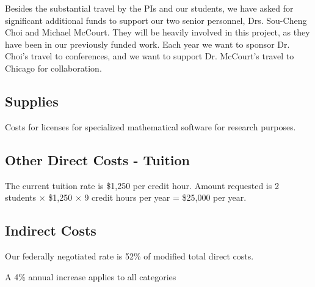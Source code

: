 \documentclass[11pt]{NSFamsart}
\begin{document}
Besides the substantial travel by the PIs and our students, we have asked for significant additional funds to support our two senior personnel, Drs. Sou-Cheng Choi and Michael McCourt.  They will be heavily involved in this project, as they have been in our previously funded work.  Each year we want to sponsor Dr. Choi’s travel to conferences, and we want to support Dr. McCourt’s travel to Chicago for collaboration.

\subsection*{Supplies}
Costs for licenses for specialized mathematical software for research purposes.

\subsection*{Other Direct Costs - Tuition}
The current tuition rate is \$1,250 per credit hour. Amount requested is 2 students $\times$ 
\$1,250 $\times$ 9 credit hours per year = \$25,000 per year.

\subsection*{Indirect Costs}
Our federally negotiated rate is 52\% of modified total direct costs.

A 4\% annual increase applies to all categories
\end{document}
